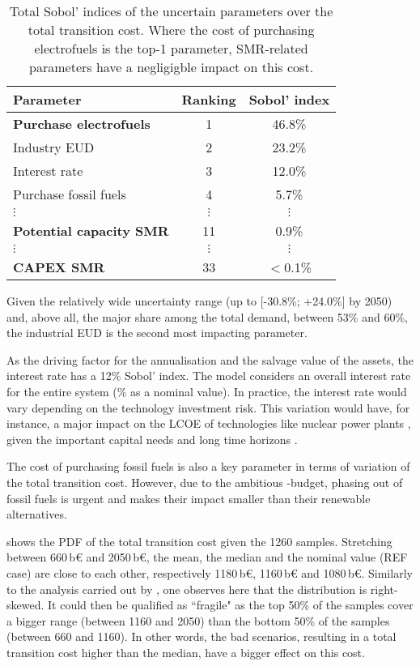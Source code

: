 \begin{table}[htbp!]
\caption{Total Sobol' indices of the uncertain parameters over the total transition cost. Where the cost of purchasing electrofuels is the top-1 parameter, \gls{SMR}-related parameters have a negligigble impact on this cost.}
\label{tab:UQ_short}
\centering
\begin{tabular}{l c c}
\toprule
\textbf{Parameter}  & \textbf{Ranking} & \textbf{Sobol' index} \\	
\midrule
\textbf{Purchase electrofuels} & 1 & 46.8\% \\
Industry EUD & 2 & 23.2\% \\
Interest rate & 3 & 12.0\% \\
Purchase fossil fuels  & 4 & 5.7\% \\
$\vdots$ & $\vdots$ & $\vdots$\\
\textbf{Potential capacity \gls{SMR}} & 11 & 0.9\% \\
$\vdots$ & $\vdots$ & $\vdots$\\
\textbf{CAPEX \gls{SMR}} & 33 & $<$0.1\% \\
\bottomrule							

\end{tabular}
\end{table}

Given the relatively wide uncertainty range (\ie up to [-30.8\%; +24.0\%] by 2050) and, above all, the major share among the total demand, between 53\% and 60\%, the industrial \gls{EUD} is the second most impacting parameter. 

As the driving factor for the annualisation and the salvage value of the assets, the interest rate has a 12\% Sobol' index. The model considers an overall interest rate for the entire system (\% as a nominal value). In practice, the interest rate would vary depending on the technology investment risk. This variation would have, for instance, a major impact on the \gls{LCOE} of technologies like nuclear power plants \cite{world_nuclear_asso}, given the important capital needs and long time horizons \cite{IEA_Nuclear_2022}.

The cost of purchasing fossil fuels is also a key parameter in terms of variation of the total transition cost. However, due to the ambitious -budget, phasing out of fossil fuels is urgent and makes their impact smaller than their renewable alternatives.

 shows the \gls{PDF} of the total transition cost given the 1260 samples. Stretching between 660\,b€ and 2050\,b€, the mean, the median and the nominal value (\ie REF case) are close to each other, respectively 1180\,b€, 1160\,b€ and 1080\,b€. Similarly to the analysis carried out by \citet{coppitters2023optimizing}, one observes here that the distribution is right-skewed. It could then be qualified as ``fragile" as the top 50\% of the samples cover a bigger range (\ie between 1160 and 2050) than the bottom 50\% of the samples (\ie between 660 and 1160). In other words, the bad scenarios, resulting in a total transition cost higher than the median, have a bigger effect on this cost.

